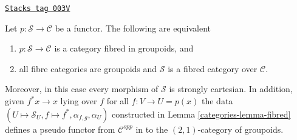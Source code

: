 \begin{lemma}
\label{categories-lemma-fibred-groupoids}
\href{https://stacks.math.columbia.edu/tag/003V}{\texttt{Stacks tag 003V}}

Let $p : \mathcal{S} \to \mathcal{C}$ be a functor.
The following are equivalent
\begin{enumerate}
\item $p : \mathcal{S} \to \mathcal{C}$ is a category
fibred in groupoids, and
\item all fibre categories are groupoids and
$\mathcal{S}$ is a fibred category over $\mathcal{C}$.
\end{enumerate}
Moreover, in this case every morphism of $\mathcal{S}$ is
strongly cartesian. In addition, given $f^\ast x \to x$
lying over $f$ for all $f: V \to U = p(x)$ the data
$(U \mapsto \mathcal{S}_U, f \mapsto f^*, \alpha_{f, g}, \alpha_U)$
constructed in Lemma \ref{categories-lemma-fibred}
defines a pseudo functor from $\mathcal{C}^{opp}$ in to
the $(2, 1)$-category of groupoids.
\end{lemma}

